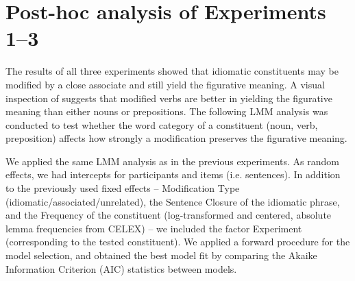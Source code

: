 \documentclass[output=paper]{langsci/langscibook}
\begin{document}
\begin{table}
\caption{Fixed effects of the predictors in the linear mixed-effect model for the paraphrase ratings in Experiment 3. \textit{Notes:} significance code: *** < 0.0001\label{tab:Table7}}
\end{table}


\section{Post-hoc analysis of Experiments 1--3}    

The results of all three experiments showed that idiomatic constituents may be modified by a close associate and still yield the figurative meaning. A visual inspection of  suggests that modified verbs are better in yielding the figurative meaning than either nouns or prepositions. The following LMM analysis was conducted to test whether the word category of a constituent (noun, verb, preposition) affects how strongly a modification preserves the figurative meaning. 

We applied the same LMM analysis as in the previous experiments. As random effects, we had intercepts for participants and items (i.e. sentences). In addition to the previously used fixed effects -- Modification Type (idiomatic\slash associated\slash unrelated), the Sentence Closure of the idiomatic phrase, and the Frequency of the constituent (log-transformed and centered, absolute lemma frequencies from CELEX) -- we included the factor Experiment (corresponding to the tested constituent).  We applied a forward procedure for the model selection, and obtained the best model fit by comparing the Akaike Information Criterion (AIC) statistics between models. 
\end{document}
